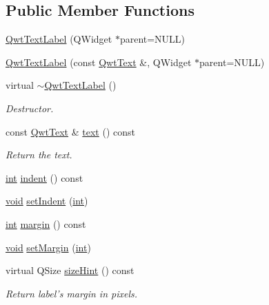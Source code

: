 \subsection*{Public Member Functions}
\begin{DoxyCompactItemize}
\item 
\hyperlink{class_qwt_text_label_a95e022e766f4b9675f451482be7d654a}{Qwt\-Text\-Label} (Q\-Widget $\ast$parent=N\-U\-L\-L)
\item 
\hyperlink{class_qwt_text_label_a1a44e38b02bb398d315affe02bb4ea69}{Qwt\-Text\-Label} (const \hyperlink{class_qwt_text}{Qwt\-Text} \&, Q\-Widget $\ast$parent=N\-U\-L\-L)
\item 
virtual \hyperlink{class_qwt_text_label_adf8f363200c527a6af4259647304be5a}{$\sim$\-Qwt\-Text\-Label} ()
\begin{DoxyCompactList}\small\item\em Destructor. \end{DoxyCompactList}\item 
const \hyperlink{class_qwt_text}{Qwt\-Text} \& \hyperlink{class_qwt_text_label_a6ff4f9a87e11594740f312c8522f933e}{text} () const 
\begin{DoxyCompactList}\small\item\em Return the text. \end{DoxyCompactList}\item 
\hyperlink{ioapi_8h_a787fa3cf048117ba7123753c1e74fcd6}{int} \hyperlink{class_qwt_text_label_a56d1c5c770efd4f829f33d0b42f00c9b}{indent} () const 
\item 
\hyperlink{group___u_a_v_objects_plugin_ga444cf2ff3f0ecbe028adce838d373f5c}{void} \hyperlink{class_qwt_text_label_aad25ab34c219f8d97ec7c39d064ed4a0}{set\-Indent} (\hyperlink{ioapi_8h_a787fa3cf048117ba7123753c1e74fcd6}{int})
\item 
\hyperlink{ioapi_8h_a787fa3cf048117ba7123753c1e74fcd6}{int} \hyperlink{class_qwt_text_label_ab754bebe50bc0e713cde9ba58bf6c3c8}{margin} () const 
\item 
\hyperlink{group___u_a_v_objects_plugin_ga444cf2ff3f0ecbe028adce838d373f5c}{void} \hyperlink{class_qwt_text_label_a833d27574b72bbc135f2972c72382eba}{set\-Margin} (\hyperlink{ioapi_8h_a787fa3cf048117ba7123753c1e74fcd6}{int})
\item 
virtual Q\-Size \hyperlink{class_qwt_text_label_a0217bc022e6f3b2f22819c84d5867ae7}{size\-Hint} () const 
\begin{DoxyCompactList}\small\item\em Return label's margin in pixels. \end{DoxyCompactList}\item 

\end{DoxyCompactItemize}
